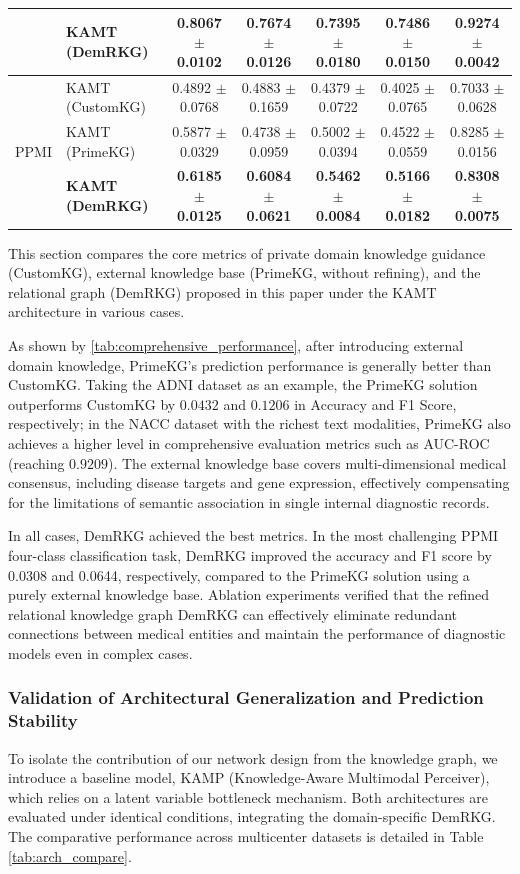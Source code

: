 \documentclass[lettersize,journal]{IEEEtran}
\begin{document}
\begin{table}[htbp]
\begin{tabular}{llccccc}
& \textbf{KAMT (DemRKG)} & \textbf{0.8067 $\pm$ 0.0102} & \textbf{0.7674 $\pm$ 0.0126} & \textbf{0.7395 $\pm$ 0.0180} & \textbf{0.7486 $\pm$ 0.0150} & \textbf{0.9274 $\pm$ 0.0042} \\
\midrule
\multirow{3}{*}{PPMI} 
& KAMT (CustomKG)      & 0.4892 $\pm$ 0.0768 & 0.4883 $\pm$ 0.1659 & 0.4379 $\pm$ 0.0722 & 0.4025 $\pm$ 0.0765 & 0.7033 $\pm$ 0.0628 \\
& KAMT (PrimeKG)       & 0.5877 $\pm$ 0.0329 & 0.4738 $\pm$ 0.0959 & 0.5002 $\pm$ 0.0394 & 0.4522 $\pm$ 0.0559 & 0.8285 $\pm$ 0.0156 \\
& \textbf{KAMT (DemRKG)} & \textbf{0.6185 $\pm$ 0.0125} & \textbf{0.6084 $\pm$ 0.0621} & \textbf{0.5462 $\pm$ 0.0084} & \textbf{0.5166 $\pm$ 0.0182} & \textbf{0.8308 $\pm$ 0.0075} \\
\bottomrule
\end{tabular}
\end{table}

This section compares the core metrics of private domain knowledge guidance (CustomKG), external knowledge base (PrimeKG, without refining), and the relational graph (DemRKG) proposed in this paper under the KAMT architecture in various cases.

As shown by \ref{tab:comprehensive_performance}, after introducing external domain knowledge, PrimeKG's prediction performance is generally better than CustomKG. Taking the ADNI dataset as an example, the PrimeKG solution outperforms CustomKG by $0.0432$ and $0.1206$ in Accuracy and F1 Score, respectively; in the NACC dataset with the richest text modalities, PrimeKG also achieves a higher level in comprehensive evaluation metrics such as AUC-ROC (reaching $0.9209$). The external knowledge base covers multi-dimensional medical consensus, including disease targets and gene expression, effectively compensating for the limitations of semantic association in single internal diagnostic records.

In all cases, DemRKG achieved the best metrics. In the most challenging PPMI four-class classification task, DemRKG improved the accuracy and F1 score by 0.0308 and 0.0644, respectively, compared to the PrimeKG solution using a purely external knowledge base. Ablation experiments verified that the refined relational knowledge graph DemRKG can effectively eliminate redundant connections between medical entities and maintain the performance of diagnostic models even in complex cases.

\subsubsection{Validation of Architectural Generalization and Prediction Stability}
To isolate the contribution of our network design from the knowledge graph, we introduce a baseline model, KAMP (Knowledge-Aware Multimodal Perceiver), which relies on a latent variable bottleneck mechanism. Both architectures are evaluated under identical conditions, integrating the domain-specific DemRKG. The comparative performance across multicenter datasets is detailed in Table \ref{tab:arch_compare}.
\end{document}
